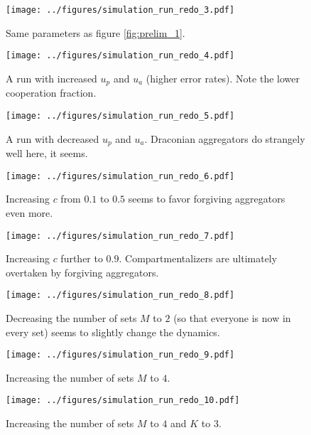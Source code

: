 \documentclass[13pt]{amsart}
\begin{document}
\begin{figure}[h]
    \texttt{[image: ../figures/simulation\_run\_redo\_3.pdf]}
    \caption{Same parameters as figure \ref{fig:prelim_1}.}
    \label{fig:prelim_3}
\end{figure}

\begin{figure}
    \texttt{[image: ../figures/simulation\_run\_redo\_4.pdf]}
    \caption{A run with increased $u_p$ and $u_a$ (higher error rates).
    Note the lower cooperation fraction.}
    \label{fig:prelim_4}
\end{figure}

\begin{figure}
    \texttt{[image: ../figures/simulation\_run\_redo\_5.pdf]}
    \caption{A run with decreased $u_p$ and $u_a$.
    Draconian aggregators do strangely well here, it seems.}
    \label{fig:prelim_5}
\end{figure}

\begin{figure}
    \texttt{[image: ../figures/simulation\_run\_redo\_6.pdf]}
    \caption{Increasing $c$ from $0.1$ to $0.5$ seems to favor forgiving aggregators even more.}
    \label{fig:prelim_6}
\end{figure}

\begin{figure}
    \texttt{[image: ../figures/simulation\_run\_redo\_7.pdf]}
    \caption{Increasing $c$ further to $0.9$.
    Compartmentalizers are ultimately overtaken by forgiving aggregators.}
    \label{fig:prelim_7}
\end{figure}

\begin{figure}
    \texttt{[image: ../figures/simulation\_run\_redo\_8.pdf]}
    \caption{Decreasing the number of sets $M$ to $2$ (so that everyone is now in every set) seems to slightly change the dynamics.}
    \label{fig:prelim_8}
\end{figure}

\begin{figure}
    \texttt{[image: ../figures/simulation\_run\_redo\_9.pdf]}
    \caption{Increasing the number of sets $M$ to $4$.}
    \label{fig:prelim_9}
\end{figure}

\begin{figure}
    \texttt{[image: ../figures/simulation\_run\_redo\_10.pdf]}
    \caption{Increasing the number of sets $M$ to $4$ and $K$ to $3$.}
    \label{fig:prelim_10}
\end{figure}
\end{document}
